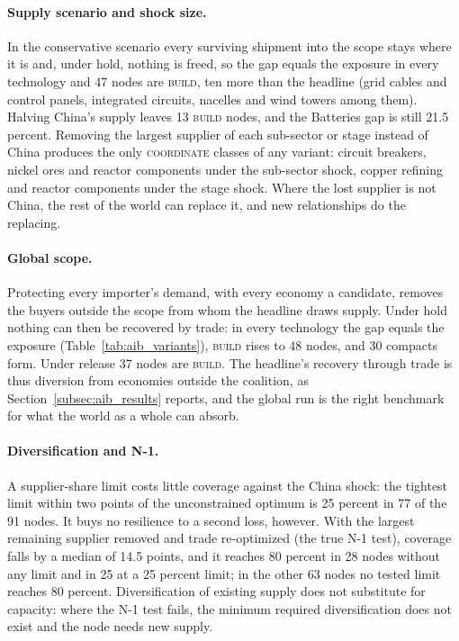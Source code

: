 \paragraph{Supply scenario and shock size.} In the conservative scenario every surviving shipment into
the scope stays where it is and, under hold, nothing is freed, so the gap equals the exposure in every
technology and 47 nodes are \textsc{build}, ten more than the headline (grid cables and control panels,
integrated circuits, nacelles and wind towers among them). Halving China's supply leaves 13
\textsc{build} nodes, and the Batteries gap is still 21.5 percent. Removing the largest
supplier of each sub-sector or stage instead of China produces the only \textsc{coordinate} classes of
any variant: circuit breakers, nickel ores and reactor components under the sub-sector shock, copper
refining and reactor components under the stage shock. Where the lost supplier is not China, the rest of
the world can replace it, and new relationships do the replacing.

\paragraph{Global scope.} Protecting every importer's demand, with every economy a candidate, removes the
buyers outside the scope from whom the headline draws supply. Under hold nothing can then be recovered by
trade: in every technology the gap equals the exposure (Table~\ref{tab:aib_variants}), \textsc{build} rises
to 48 nodes, and 30 compacts form. Under release 37 nodes are \textsc{build}. The headline's recovery
through trade is thus diversion from economies outside the coalition, as Section~\ref{subsec:aib_results}
reports, and the global run is the right benchmark for what the world as a whole can absorb.

\paragraph{Diversification and N-1.} A supplier-share limit costs little coverage against the China
shock: the tightest limit within two points of the unconstrained optimum is 25 percent in 77 of the 91
nodes. It buys no resilience to a second loss, however. With the largest remaining supplier removed and
trade re-optimized (the true N-1 test), coverage falls by a median of 14.5 points, and it reaches 80
percent in 28 nodes without any limit and in 25 at a 25 percent limit; in the other 63 nodes no tested
limit reaches 80 percent. Diversification of existing supply does not substitute for capacity: where the
N-1 test fails, the minimum required diversification does not exist and the node needs new supply.

